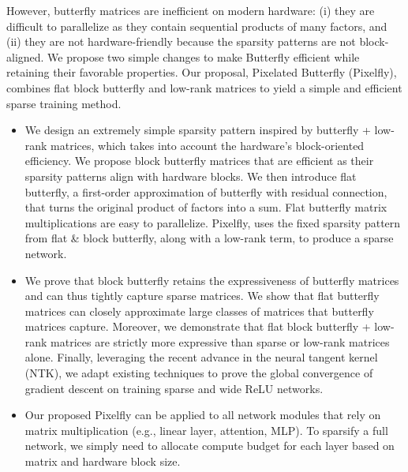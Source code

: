 However, butterfly matrices are inefficient on modern hardware: (i) they are difficult to parallelize as they contain sequential products of many factors, and (ii) they are not hardware-friendly because the sparsity patterns are not block-aligned.
We propose two simple changes to make Butterfly efficient while retaining their favorable properties. Our proposal, Pixelated Butterfly (Pixelfly), combines flat block butterfly and low-rank matrices to yield a simple and efficient sparse training method.
\begin{itemize}[leftmargin=*,nosep,nolistsep]
\item We design an extremely simple sparsity pattern inspired by butterfly + low-rank matrices, which takes into account the hardware's block-oriented efficiency.
We propose block butterfly matrices that are efficient as their sparsity patterns align with hardware blocks.
We then introduce flat butterfly, a first-order approximation of butterfly with residual connection, that turns the original product of factors into a sum.
Flat butterfly matrix multiplications are easy to parallelize.
Pixelfly, uses the fixed sparsity pattern from flat \& block butterfly, along with a low-rank term, to produce a sparse network.
\item We prove that block butterfly retains the expressiveness of butterfly matrices and can thus tightly capture sparse matrices.
We show that flat butterfly matrices can closely approximate large classes of matrices that butterfly matrices capture.
Moreover, we demonstrate that flat block butterfly + low-rank matrices are strictly more expressive than sparse or low-rank matrices alone.
Finally, leveraging the recent advance in the neural tangent kernel (NTK), we adapt existing techniques to prove the global convergence of gradient descent on training sparse and wide ReLU networks.
\item Our proposed Pixelfly can be applied to all network modules that rely on matrix multiplication (e.g., linear layer, attention, MLP). To sparsify a full network, we simply need to allocate compute budget for each layer based on matrix and hardware block size.
\end{itemize}

